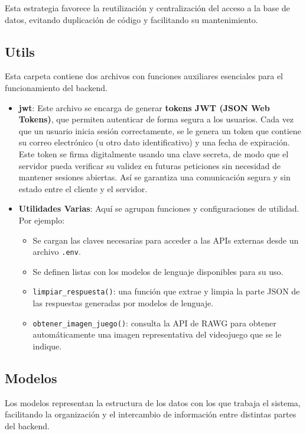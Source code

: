 Esta estrategia favorece la reutilización y centralización del acceso a la base de datos, evitando duplicación de código y facilitando su mantenimiento.


\subsection{Utils}

Esta carpeta contiene dos archivos con funciones auxiliares esenciales para el funcionamiento del backend.

\begin{itemize}
	\item \textbf{jwt}: Este archivo se encarga de generar \textbf{tokens JWT (JSON Web Tokens)}, que permiten autenticar de forma segura a los usuarios. Cada vez que un usuario inicia sesión correctamente, se le genera un token que contiene su correo electrónico (u otro dato identificativo) y una fecha de expiración. Este token se firma digitalmente usando una clave secreta, de modo que el servidor pueda verificar su validez en futuras peticiones sin necesidad de mantener sesiones abiertas. Así se garantiza una comunicación segura y sin estado entre el cliente y el servidor.
	
	\item \textbf{Utilidades Varias}: Aquí se agrupan funciones y configuraciones de utilidad. Por ejemplo:
	\begin{itemize}
		\item Se cargan las claves necesarias para acceder a las APIs externas desde un archivo \texttt{.env}.
		\item Se definen listas con los modelos de lenguaje disponibles para su uso.
		\item \texttt{limpiar\_respuesta()}: una función que extrae y limpia la parte JSON de las respuestas generadas por modelos de lenguaje.
		\item \texttt{obtener\_imagen\_juego()}: consulta la API de RAWG para obtener automáticamente una imagen representativa del videojuego que se le indique.
	\end{itemize}
\end{itemize}


\subsection{Modelos}

Los modelos representan la estructura de los datos con los que trabaja el sistema, facilitando la organización y el intercambio de información entre distintas partes del backend.


